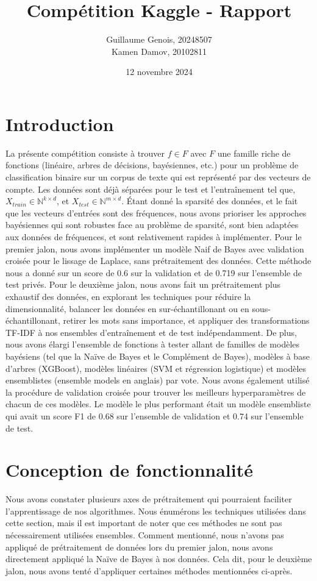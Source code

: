 \documentclass{article}
\title{Compétition Kaggle - Rapport}
\author{Guillaume Genois, 20248507 \\Kamen Damov, 20102811}
\date{12 novembre 2024}
\begin{document}
\maketitle

\section{Introduction}
La présente compétition consiste à trouver $f \in F$ avec $F$ une famille riche de fonctions (linéaire, arbres de décisions, bayésiennes, etc.) pour un problème de classification binaire sur un corpus de texte qui est représenté par des vecteurs de compte. Les données sont déjà séparées pour le test et l'entraînement tel que, $X_{train} \in \mathbb{N}^{k \times d}$, et $X_{test} \in \mathbb{N}^{m \times d}$. Étant donné la sparsité des données, et le fait que les vecteurs d'entrées sont des fréquences, nous avons prioriser les approches bayésiennes qui sont robustes face au problème de sparsité, sont bien adaptées aux données de fréquences, et sont relativement rapides à implémenter. Pour le premier jalon, nous avons implémenter un modèle Naif de Bayes avec validation croisée pour le lissage de Laplace, sans prétraitement des données. Cette méthode nous a donné sur un score de 0.6 sur la validation et de 0.719  sur l'ensemble de test privés. Pour le deuxième jalon, nous avons fait un prétraitement plus exhaustif des données, en explorant les techniques pour réduire la dimensionnalité, balancer les données en sur-échantillonant ou en sous-échantillonant, retirer les mots sans importance, et appliquer des transformations TF-IDF à nos ensembles d'entraînement et de test indépendamment. De plus, nous avons élargi l'ensemble de fonctions à tester allant de familles de modèles bayésiens (tel que la Naïve de Bayes et le Complément de Bayes), modèles à base d'arbres (XGBoost), modèles linéaires (SVM et régression logistique) et modèles ensemblistes (ensemble models en anglais) par vote. Nous avons également utilisé la procédure de validation croisée pour trouver les meilleurs hyperparamètres de chacun de ces modèles. Le modèle le plus performant était un modèle ensembliste qui avait un score F1 de 0.68 sur l'ensemble de validation et 0.74 sur l'ensemble de test.

\section{Conception de fonctionnalité}
Nous avons constater plusieurs axes de prétraitement qui pourraient faciliter l'apprentissage de nos algorithmes. Nous énumérons les techniques utilisées dans cette section, mais il est important de noter que ces méthodes ne sont pas nécessairement utilisées ensembles. Comment mentionné, nous n'avons pas appliqué de prétraitement de données lors du premier jalon, nous avons directement appliqué la Naïve de Bayes à nos données. Cela dit, pour le deuxième jalon, nous avons tenté d'appliquer certaines méthodes mentionnées ci-après.
\end{document}
